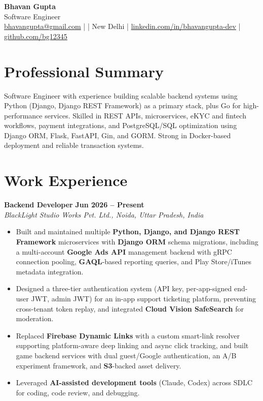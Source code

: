 \documentclass[10pt,letterpaper]{article}
\begin{document}
\begin{center}
    {\Large \textbf{Bhavan Gupta}}\\[1pt]
    {\normalsize Software Engineer}\\[2pt]
    \small
    \href{mailto:bhavangupta@gmail.com}{bhavangupta@gmail.com} \;| \;|\;
    New Delhi \;|\;
    \href{https://linkedin.com/in/bhavangupta-dev}{linkedin.com/in/bhavangupta-dev} \;|\;
    \href{https://github.com/bg12345}{github.com/bg12345}
\end{center}
\vspace{1pt}

\section*{Professional Summary}
Software Engineer with experience building scalable backend systems using Python (Django, Django REST Framework) as a primary stack, plus Go for high-performance services. Skilled in REST APIs, microservices, eKYC and fintech workflows, payment integrations, and PostgreSQL/SQL optimization using Django ORM, Flask, FastAPI, Gin, and GORM. Strong in Docker-based deployment and reliable transaction systems.

\section*{Work Experience}

\textbf{Backend Developer} \hfill \textbf{Jun 2026 -- Present}\\
\textit{BlackLight Studio Works Pvt. Ltd., Noida, Uttar Pradesh, India}
\begin{itemize}
    \item Built and maintained multiple \textbf{Python, Django, and Django REST Framework} microservices with \textbf{Django ORM} schema migrations, including a multi-account \textbf{Google Ads API} management backend with gRPC connection pooling, \textbf{GAQL}-based reporting queries, and Play Store/iTunes metadata integration.
    \item Designed a three-tier authentication system (API key, per-app-signed end-user JWT, admin JWT) for an in-app support ticketing platform, preventing cross-tenant token replay, and integrated \textbf{Cloud Vision SafeSearch} for moderation.
    \item Replaced \textbf{Firebase Dynamic Links} with a custom smart-link resolver supporting platform-aware deep linking and async click tracking, and built game backend services with dual guest/Google authentication, an A/B experiment framework, and \textbf{S3}-backed asset delivery.
    \item Leveraged \textbf{AI-assisted development tools} (Claude, Codex) across SDLC for coding, code review, and debugging.
\end{itemize}
\end{document}
